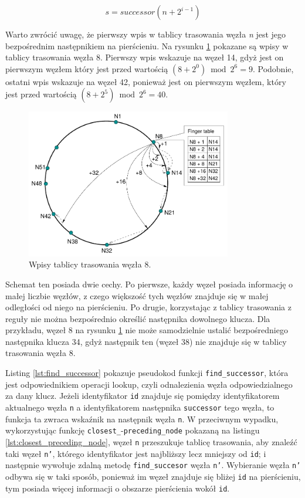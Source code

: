\documentclass[12pt, twoside, openany]{report}
\begin{document}
\begin{equation}
\label{eq:start}
s=successor(n+2^{i-1})
\end{equation}

Warto zwrócić uwagę, że pierwszy wpis w tablicy trasowania węzła \textit{n} jest jego bezpośrednim następnikiem na pierścieniu. Na rysunku \ref{fig:finger_table} pokazane są wpisy w tablicy trasowania węzła 8. Pierwszy wpis wskazuje na węzeł 14, gdyż jest on pierwszym węzłem który jest przed wartością $(8+2^0) \bmod 2^6=9$. Podobnie, ostatni wpis wskazuje na węzeł 42, ponieważ jest on pierwszym węzłem, który jest przed wartością $(8+2^5) \bmod 2^6=40$.

\begin{figure}[H]
\centering
\includegraphics[width=0.8\textwidth,height=\textheight,keepaspectratio]{finger_table.png}
\caption{Wpisy tablicy trasowania węzła 8.}
\label{fig:finger_table}
\end{figure}

Schemat ten posiada dwie cechy. Po pierwsze, każdy węzeł posiada informację o małej liczbie węzłów, z czego większość tych węzłów znajduje się w małej odległości od niego na pierścieniu. Po drugie, korzystając z tablicy trasowania z reguły nie można bezpośrednio określić następnika dowolnego klucza. Dla przykładu, węzeł 8 na rysunku \ref{fig:finger_table} nie może samodzielnie ustalić bezpośredniego następnika klucza 34, gdyż następnik ten (węzeł 38) nie znajduje się w tablicy trasowania węzła 8.

Listing \ref{lst:find_successor} pokazuje pseudokod funkcji \texttt{find\_successor}, która jest odpowiednikiem operacji lookup, czyli odnalezienia węzła odpowiedzialnego za dany klucz. Jeżeli identyfikator \texttt{id} znajduje się pomiędzy identyfikatorem aktualnego węzła \texttt{n} a identyfikatorem następnika \texttt{successor} tego węzła, to funkcja ta zwraca wskaźnik na następnik węzła \texttt{n}. W przeciwnym wypadku, wykorzystując funkcję \texttt{closest\_}-\texttt{preceding\_node} pokazaną na listingu \ref{lst:closest_preceding_node}, węzeł \texttt{n} przeszukuje tablicę trasowania, aby znaleźć taki węzeł \texttt{n'}, którego identyfikator jest najbliższy lecz mniejszy od \texttt{id}; i następnie wywołuje zdalną metodę \texttt{find\_succesor} węzła \texttt{n'}. Wybieranie węzła \texttt{n'} odbywa się w taki sposób, ponieważ im węzeł znajduje się bliżej \texttt{id} na pierścieniu, tym posiada więcej informacji o obszarze pierścienia wokół \texttt{id}.
\end{document}
